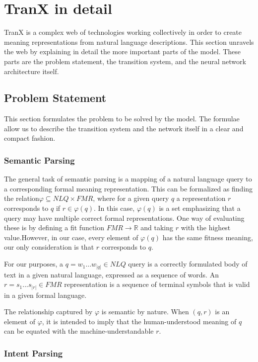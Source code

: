 \section{TranX in detail}
TranX is a complex web of technologies working collectively in order to create meaning
representations from natural language descriptions. This section unravels the web by
explaining in detail the more important parts of the model. These parts are the problem
statement, the transition system, and the neural network architecture itself.

\subsection{Problem Statement}
This section formulates the problem to be solved by the model. The formulae allow
us to describe the transition system and the network itself in a clear and compact
fashion.

\subsubsection{Semantic Parsing}\label{sec:parsing}

The general task of semantic parsing is a mapping of a natural language query to a
corresponding formal meaning representation. This can be formalized as finding
the relation\(\varphi \subseteq NLQ \times FMR\)\label{form:fmr}, where for
a given query \(q\) a representation \(r\) corresponds to \(q\) if 
\(r \in \varphi(q)\). In this case, \( \varphi(q) \) is a set emphasizing
that a query may have multiple correct formal representations. One way of 
evaluating these is by defining a fit function \( FMR \to \mathbb{R} \)
and taking \( r \) with the highest value.However, in our case, every
element of \( \varphi(q) \) has the same fitness meaning, our only
consideration is that \(r\) corresponds to \(q\).

For our purposes, a \(q = w_{1} \dots w_{|q|} \in NLQ\) query is a correctly
formulated body of text in a given natural language, expressed as a sequence of words.
An \(r = s_{1} ... s_{|r|} \in FMR\) representation is a sequence of terminal symbols
that is valid in a given formal language.

The relationship captured by \(\varphi\) is semantic by nature. When \((q, r)\) is
an element of \(\varphi\), it is intended to imply that the human-understood
meaning of \(q\) can be equated with the machine-understandable \(r\). 
 
\subsubsection{Intent Parsing}

